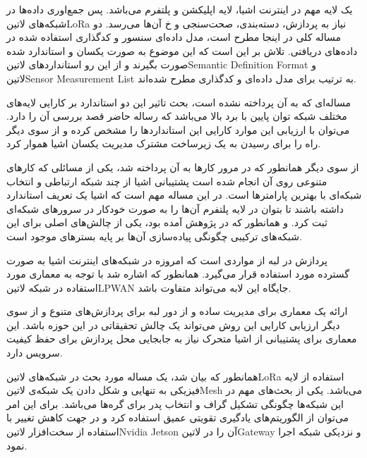 
یک لایه مهم در اینترنت اشیا، لایه اپلیکشن و پلتفرم می‌باشد. پس جمع‌اوری داده‌ها در شبکه‌های ‌لاتین{LoRa} نیاز به پردازش، دسته‌بندی، صحت‌سنجی و ‌خ
آن‌ها می‌رسد. دو مساله کلی در اینجا مطرح است، مدل داده‌ای سنسور و کدگذاری استفاده شده در داده‌های دریافتی. تلاش بر این است که این موضوع به صورت
یکسان و استاندارد شده صورت بگیرند و از این رو استانداردهای ‌لاتین{Semantic Definition Format} و ‌لاتین{Sensor Measurement List} به ترتیب برای مدل داده‌ای و کدگذاری مطرح شده‌اند.

مساله‌ای که به آن پرداخته نشده است، بحث تاثیر این دو استاندارد بر کارایی لایه‌های مختلف شبکه توان پایین با برد بالا می‌باشد که رساله حاضر قصد بررسی آن را دارد.
می‌توان با ارزیابی این موارد کارایی این استانداردها را مشخص کرده و از سوی دیگر راه را برای رسیدن به یک زیرساخت مشترک مدیریت یکسان اشیا هموار کرد.

از سوی دیگر همانطور که در مرور کارها به آن پرداخته شد، یکی از مسائلی که کارهای متنوعی روی آن انجام شده است پشتیبانی اشیا از چند شبکه ارتباطی و انتخاب شبکه‌ای با بهترین
پارامترها است. در این مساله مهم است که اشیا یک تعریف استاندارد داشته باشند تا بتوان در لایه پلتفرم آن‌ها را به صورت خودکار در سرورهای شبکه‌ای ثبت کرد.
و همانطور که در پژوهش  آمده بود، یکی از چالش‌های اصلی برای این شبکه‌های ترکیبی چگونگی پیاده‌سازی آن‌ها بر پایه بسترهای موجود است.


پردازش در لبه از مواردی است که امروزه در شبکه‌های اینترنت اشیا به صورت گسترده مورد استفاده قرار می‌گیرد.
همانطور که اشاره شد با توجه به معماری مورد استفاده در شبکه ‌لاتین{LPWAN} جایگاه این لابه می‌تواند متفاوت باشد.

ارائه یک معماری برای مدیریت ساده و از دور لبه برای پردازش‌های متنوع و از سوی دیگر ارزیابی کارایی این روش می‌تواند یک چالش تحقیقاتی در این حوزه باشد.
این معماری برای پشتیبانی از اشیا متحرک نیاز به جابجایی محل پردازش برای حفظ کیفیت سرویس دارد.


همانطور که بیان شد، یک مساله مورد بحث در شبکه‌های ‌لاتین{LoRa} استفاده از لایه فیزیکی به تنهایی و شکل دادن یک شبکه‌ی ‌لاتین{Mesh} می‌باشد.
یکی از بحث‌های مهم در این شبکه‌ها چگونگی تشکیل گراف و انتخاب پدر برای گره‌ها می‌باشد. برای این امر می‌توان از الگوریتم‌های یادگیری تقویتی عمیق استفاده کرد
و در جهت کاهش تغییر با استفاده از سخت‌افزار ‌لاتین{Nvidia Jetson} آن را در ‌لاتین{Gateway} و نزدیکی شبکه اجرا نمود.

